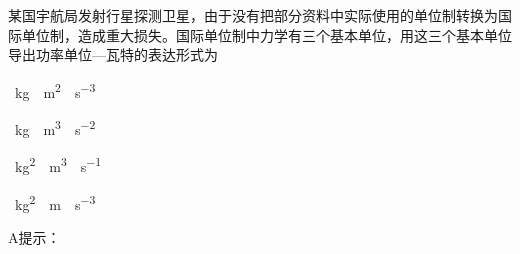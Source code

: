 某国宇航局发射行星探测卫星，由于没有把部分资料中实际使用的单位制转换为国际单位制，造成重大损失。国际单位制中力学有三个基本单位，用这三个基本单位导出功率单位—瓦特的表达形式为\paren[]
\begin{choices}
	\item \qty{}{kg\cdot m^2\cdot s^{-3}}
	\item \qty{}{kg\cdot m^3\cdot s^{-2}}
	\item \qty{}{kg^2\cdot m^3\cdot s^{-1}}
	\item \qty{}{kg^2\cdot m\cdot s^{-3}}
\end{choices}
\begin{answer}
    A\qquad 提示：
\end{answer}